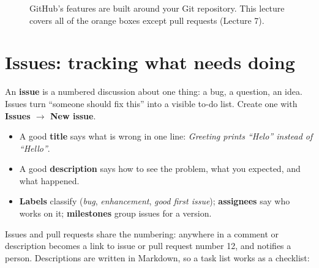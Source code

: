 \begin{figure}[H]
\centering
{}
\caption{GitHub's features are built around your Git repository. This lecture covers all of the orange boxes except pull requests (Lecture 7).}
\label{fig:features}
\end{figure}

\section{Issues: tracking what needs doing}

An \textbf{issue} is a numbered discussion about one thing: a bug, a question, an idea. Issues turn ``someone should fix this'' into a visible to-do list. Create one with \textbf{Issues $\rightarrow$ New issue}.

\begin{itemize}
  \item A good \textbf{title} says what is wrong in one line: \emph{Greeting prints ``Helo'' instead of ``Hello''}.
  \item A good \textbf{description} says how to see the problem, what you expected, and what happened.
  \item \textbf{Labels} classify (\emph{bug}, \emph{enhancement}, \emph{good first issue}); \textbf{assignees} say who works on it; \textbf{milestones} group issues for a version.
\end{itemize}

Issues and pull requests share the numbering:  anywhere in a comment or description becomes a link to issue or pull request number 12, and  notifies a person. Descriptions are written in Markdown, so a task list works as a checklist:

